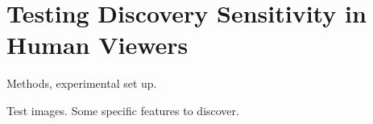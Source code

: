 \documentclass[letterpaper, 11pt]{article}
\begin{document}

\section{Testing Discovery Sensitivity in Human Viewers}

Methods, experimental set up. 

Test images. Some specific features to discover.


\end{document}
